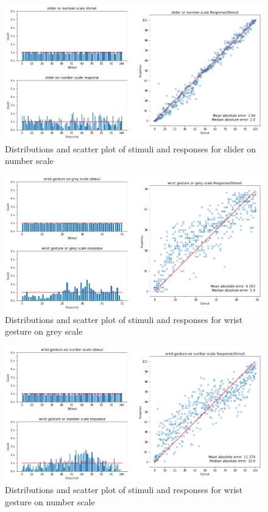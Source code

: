 \begin{figure}[p]
    \centering
    \includegraphics[width=1.2\textwidth]{figures/dist_scatter2.png}
    \caption{Distributions and scatter plot of stimuli and responses for slider on number scale}
    \label{dist_scatter2}
\end{figure}

\begin{figure}[p]
    \centering
    \includegraphics[width=1.2\textwidth]{figures/dist_scatter3.png}
    \caption{Distributions and scatter plot of stimuli and responses for wrist gesture on grey scale}
    \label{dist_scatter3}
\end{figure}

\begin{figure}[p]
    \centering
    \includegraphics[width=1.2\textwidth]{figures/dist_scatter4.png}
    \caption{Distributions and scatter plot of stimuli and responses for wrist gesture on number scale}
    \label{dist_scatter4}
\end{figure}


